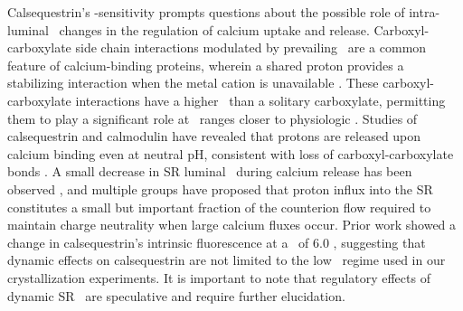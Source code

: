 Calsequestrin's \pH-sensitivity prompts questions about the possible role of intra-luminal \pH\ changes in the regulation of calcium uptake and release. Carboxyl-carboxylate side chain interactions modulated by prevailing \pH\ are a common feature of calcium-binding proteins, wherein a shared proton provides a stabilizing interaction when the metal cation is unavailable \supercite{Krause1991-le,Milos1986-kp}. These carboxyl-carboxylate interactions have a higher \pKa\ than a solitary carboxylate, permitting them to play a significant role at \pH\ ranges closer to physiologic \supercite{Krause1991-le,Sawyer1982-sm}. Studies of calsequestrin and calmodulin have revealed that protons are released upon calcium binding even at neutral pH, consistent with loss of carboxyl-carboxylate bonds \supercite{Krause1991-le,Milos1986-kp}. A small decrease in SR luminal \pH\ during calcium release has been observed \supercite{Kamp1998-wc}, and multiple groups have proposed that proton influx into the SR constitutes a small but important fraction of the counterion flow required to maintain charge neutrality when large calcium fluxes occur. Prior work showed a change in calsequestrin's intrinsic fluorescence at a \pH\ of 6.0 \supercite{Hidalgo1996-fm}, suggesting that dynamic effects on calsequestrin are not limited to the low \pH\ regime used in our crystallization experiments. It is important to note that regulatory effects of dynamic SR \pH\ are speculative and require further elucidation.

%

